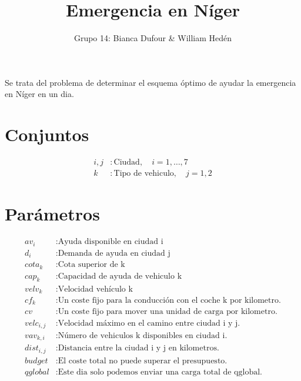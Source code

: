 \documentclass[]{article}
\title{Emergencia en Níger}
\author{Grupo 14: Bianca Dufour \& William Hedén}
\begin{document}
\maketitle

\noindent Se trata del problema de determinar el esquema óptimo de ayudar la emergencia en Níger en un dia.
\section{Conjuntos}
\begin{align*}
	i,j&: \text{Ciudad}, \quad i=1,\dots,7\\
	k&: \text{Tipo de vehiculo}, \quad j=1, 2
\end{align*}

\section{Parámetros}
\begin{align*}
	av_i &: \text{Ayuda disponible en ciudad i}\\
	d_i &: \text{Demanda de ayuda en ciudad j}\\
	cota_k &: \text{Cota superior de k}\\
	cap_k &: \text{Capacidad de ayuda de vehiculo k}\\
	velv_k &: \text{Velocidad vehículo k}\\
	cf_k &: \text{Un coste fijo para la conducción con el coche k por kilometro.}\\
	cv &: \text{Un coste fijo para mover una unidad de carga por kilometro.}\\
	velc_{i,j} &: \text{Velocidad máximo en el camino entre ciudad i y j.}\\
	vav_{k,i} &: \text{Número de vehiculos k disponibles en ciudad i.}\\
	dist_{i,j} &: \text{Distancia entre la ciudad i y j en kilometros.}\\
	budget &: \text{El coste total no puede superar el presupuesto.}\\
	qglobal &: \text{Este dia solo podemos enviar una carga total de qglobal.}
\end{align*}
\end{document}
